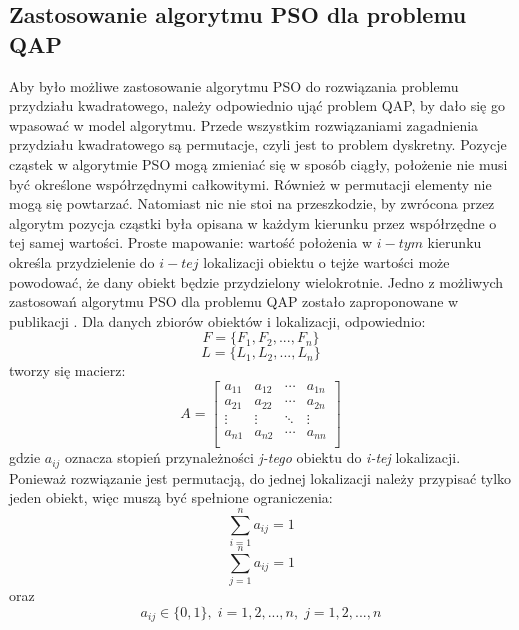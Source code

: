\subsection{Zastosowanie algorytmu PSO dla problemu QAP}
Aby było możliwe zastosowanie algorytmu PSO do rozwiązania problemu przydziału kwadratowego, należy odpowiednio ująć problem QAP, by dało się go wpasować w model algorytmu. Przede wszystkim rozwiązaniami zagadnienia przydziału kwadratowego są permutacje, czyli jest to problem dyskretny. Pozycje cząstek w algorytmie PSO mogą zmieniać się w sposób ciągły, położenie nie musi być określone współrzędnymi całkowitymi. Również w permutacji elementy nie mogą się powtarzać. Natomiast nic nie stoi na przeszkodzie, by zwrócona przez algorytm pozycja cząstki była opisana w każdym kierunku przez współrzędne o tej samej wartości. Proste mapowanie: wartość położenia w $i-tym$ kierunku określa przydzielenie do $i-tej$ lokalizacji obiektu o tejże wartości może powodować, że dany obiekt będzie przydzielony wielokrotnie.
Jedno z możliwych zastosowań algorytmu PSO dla problemu QAP zostało zaproponowane w publikacji \cite{PSO2}. Dla danych zbiorów obiektów i lokalizacji, odpowiednio:
\newline
\begin{equation}
F=\{F_1,F_2,...,F_n\}
\end{equation}
\newline
\begin{equation}
L=\{L_1,L_2,...,L_n\}
\end{equation}
\newline
tworzy się macierz:
\newline
\begin{equation}
\label{PSO_A}
A=
\begin{bmatrix}
a_{11} & a_{12} & \cdots & a_{1n} \\
a_{21} & a_{22} & \cdots & a_{2n} \\
\vdots & \vdots & \ddots & \vdots \\
a_{n1} & a_{n2} & \cdots & a_{nn} \\
\end{bmatrix}
\end{equation}
\newline
gdzie $a_{ij}$ oznacza stopień przynależności \textit{j-tego} obiektu do \textit{i-tej} lokalizacji. Ponieważ  rozwiązanie jest permutacją, do jednej lokalizacji należy przypisać tylko jeden obiekt, więc muszą być spełnione ograniczenia:
\newline
\begin{equation}
\label{pso_suma_po_i}
\sum\limits_{i=1}^n a_{ij}=1
\end{equation}
\newline
\begin{equation}
\label{pso_suma_po_j}
\sum\limits_{j=1}^n a_{ij}=1
\end{equation}
\newline
oraz
\newline
\begin{equation}
a_{ij} \in \{0,1\}, \; i=1,2,...,n, \; j=1,2,...,n
\end{equation}
\newline

